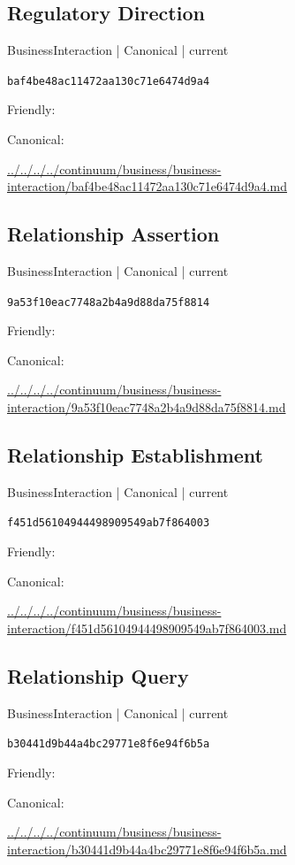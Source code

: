 \documentclass[10pt,a4paper]{article}
\begin{document}
\subsection*{Regulatory Direction}
{\small BusinessInteraction | Canonical | current}\par
\texttt{baf4be48ac11472aa130c71e6474d9a4}\par
Friendly: \par
Canonical: \par
{\footnotesize\url{../../../../continuum/business/business-interaction/baf4be48ac11472aa130c71e6474d9a4.md}}\par
\subsection*{Relationship Assertion}
{\small BusinessInteraction | Canonical | current}\par
\texttt{9a53f10eac7748a2b4a9d88da75f8814}\par
Friendly: \par
Canonical: \par
{\footnotesize\url{../../../../continuum/business/business-interaction/9a53f10eac7748a2b4a9d88da75f8814.md}}\par
\subsection*{Relationship Establishment}
{\small BusinessInteraction | Canonical | current}\par
\texttt{f451d56104944498909549ab7f864003}\par
Friendly: \par
Canonical: \par
{\footnotesize\url{../../../../continuum/business/business-interaction/f451d56104944498909549ab7f864003.md}}\par
\subsection*{Relationship Query}
{\small BusinessInteraction | Canonical | current}\par
\texttt{b30441d9b44a4bc29771e8f6e94f6b5a}\par
Friendly: \par
Canonical: \par
{\footnotesize\url{../../../../continuum/business/business-interaction/b30441d9b44a4bc29771e8f6e94f6b5a.md}}\par
\end{document}

